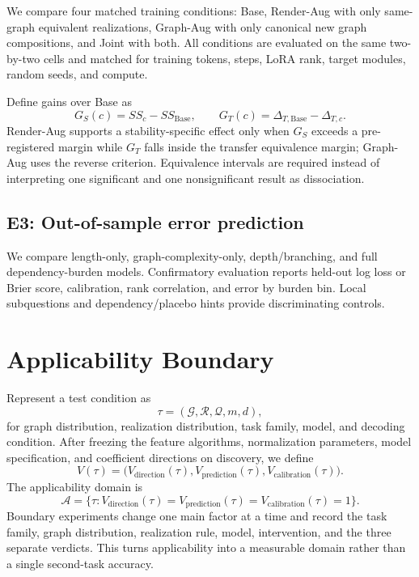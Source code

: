 \documentclass[11pt,a4paper]{article}
\theoremstyle{plain}
\begin{document}
We compare four matched training conditions: Base, Render-Aug with only
same-graph equivalent realizations, Graph-Aug with only canonical new graph
compositions, and Joint with both. All conditions are evaluated on the same
two-by-two cells and matched for training tokens, steps, LoRA rank, target
modules, random seeds, and compute.

Define gains over Base as
\begin{equation}
G_S(c)=SS_c-SS_{\mathrm{Base}},\qquad
G_T(c)=\Delta_{T,\mathrm{Base}}-\Delta_{T,c}.
\end{equation}
Render-Aug supports a stability-specific effect only when $G_S$ exceeds a
pre-registered margin while $G_T$ falls inside the transfer equivalence margin;
Graph-Aug uses the reverse criterion. Equivalence intervals are required
instead of interpreting one significant and one nonsignificant result as
dissociation.

\subsection{E3: Out-of-sample error prediction}

We compare length-only, graph-complexity-only, depth/branching, and full
dependency-burden models. Confirmatory evaluation reports held-out log loss or
Brier score, calibration, rank correlation, and error by burden bin. Local
subquestions and dependency/placebo hints provide discriminating controls.

\section{Applicability Boundary}

Represent a test condition as
\begin{equation}
\tau=(\mathcal G,\mathcal R,\mathcal Q,m,d),
\end{equation}
for graph distribution, realization distribution, task family, model, and
decoding condition. After freezing the feature algorithms, normalization
parameters, model specification, and coefficient directions on discovery, we
define
\begin{equation}
V(\tau)=
\bigl(
V_{\mathrm{direction}}(\tau),
V_{\mathrm{prediction}}(\tau),
V_{\mathrm{calibration}}(\tau)
\bigr).
\end{equation}
The applicability domain is
\begin{equation}
\mathcal A=\{\tau:V_{\mathrm{direction}}(\tau)=V_{\mathrm{prediction}}(\tau)=V_{\mathrm{calibration}}(\tau)=1\}.
\end{equation}
Boundary experiments change one main factor at a time and record the task
family, graph distribution, realization rule, model, intervention, and the
three separate verdicts. This turns applicability into a measurable domain
rather than a single second-task accuracy.
\end{document}
